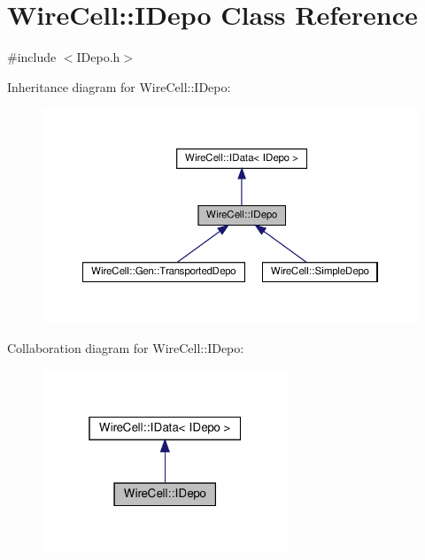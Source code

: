 \hypertarget{class_wire_cell_1_1_i_depo}{}\section{Wire\+Cell\+:\+:I\+Depo Class Reference}
\label{class_wire_cell_1_1_i_depo}


{\ttfamily \#include $<$I\+Depo.\+h$>$}



Inheritance diagram for Wire\+Cell\+:\+:I\+Depo\+:
\nopagebreak
\begin{figure}[H]
\begin{center}
\leavevmode
\includegraphics[width=350pt]{class_wire_cell_1_1_i_depo__inherit__graph}
\end{center}
\end{figure}


Collaboration diagram for Wire\+Cell\+:\+:I\+Depo\+:
\nopagebreak
\begin{figure}[H]
\begin{center}
\leavevmode
\includegraphics[width=208pt]{class_wire_cell_1_1_i_depo__coll__graph}
\end{center}
\end{figure}
